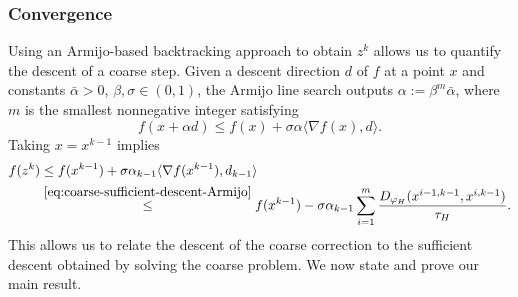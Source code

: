 \documentclass[11pt,reqno]{amsart}
\numberwithin{equation}{section}
\numberwithin{figure}{section}
\theoremstyle{plain}
\theoremstyle{definition}
\newtheorem{remark}[theorem]{Remark}
\newenvironment{assumptionp}[1]{
  \renewcommand\theassumptionalt{#1}
  \assumptionalt
}{\endassumptionalt}
\newcommand{\R}{\mathbb{R}}
\newcommand{\la}{\langle}
\newcommand{\ra}{\rangle}
\newcommand{\vphi}{\varphi}
\newcommand{\df}{\nabla f}
\DeclareMathOperator{\intr}{int}
\begin{document}
\subsubsection{Convergence}\label{sec:2l-BPGD-convergence}
Using an Armijo-based backtracking approach to obtain $z^k$ allows us to quantify the descent of a coarse step.
Given a descent direction $d$ of $f$ at a point $x$ and constants $\bar \alpha > 0$, $\beta, \sigma \in (0,1)$, the Armijo line search outputs $\alpha := \beta^m \bar \alpha$, where $m$ is the smallest nonnegative integer satisfying
\begin{equation} \label{eq:Armijo-line-search}
    f(x + \alpha d ) \leq f(x) + \sigma \alpha \la \df(x), d \ra.
\end{equation}
Taking $x = x^{k-1}$ implies
\begin{align}
    f(z^k) &\leq f(x^{k-1}) + \sigma \alpha_{k-1} \la \df(x^{k-1}), d_{k-1} \ra \\
    &\overset{\eqref{eq:coarse-sufficient-descent-Armijo}}{\leq }f(x^{k-1}) - \sigma \alpha_{k-1} \sum_{i = 1}^m \frac{D_{\vphi_H}(x^{i-1,k-1}, x^{i,k-1})}{\tau_H}. \label{eq:Armijo-descent}
\end{align}
This allows us to relate the descent of the coarse correction to the sufficient descent obtained by solving the coarse problem. We now state and prove our main result.
\end{document}
